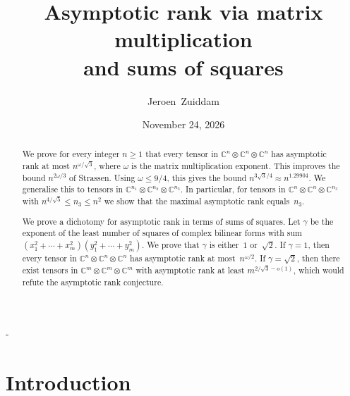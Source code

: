 \documentclass[11pt,letterpaper]{article}
\title{Asymptotic rank via matrix multiplication\\ and sums of squares}
\author{Jeroen~Zuiddam}
\date{November 24, 2026}
\affil{University of Amsterdam}
\makeatletter
\numberwithin{equation}{section}
\newcommand{\reservelines}[1]{\par\penalty\z@\dimen@\pagegoal\advance\dimen@-\pagetotal
 \ifdim\dimen@<#1\baselineskip\ifdim\dimen@>\z@\vfil\fi\break\fi}
\let\plainsection\section
\renewcommand{\section}{\reservelines{7}\plainsection}
\theoremstyle{definition}
\newcommand{\CC}{\mathbb{C}}
\makeatother
\begin{document}
\maketitle

\begin{abstract}
We prove for every integer $n\ge1$ that every tensor in $\CC^n\otimes\CC^n\otimes\CC^n$ has asymptotic rank at most $n^{\omega/\sqrt3}$, where
$\omega$ is the matrix multiplication exponent. This improves the bound $n^{2\omega/3}$ of Strassen. Using
$\omega\le9/4$, this gives the bound $n^{3\sqrt3/4}\approx n^{1.29904}$. We generalise this to tensors in $\CC^{n_1} \otimes \CC^{n_2} \otimes \CC^{n_3}$. In particular, for tensors in $\CC^n\otimes\CC^n\otimes\CC^{n_3}$ with
$n^{4/\sqrt5}\le n_3\le n^2$ we show that the maximal asymptotic rank equals~$n_3$. 

We prove a dichotomy for asymptotic rank in terms of sums of squares. Let $\gamma$ be the
exponent of the least number of squares of complex bilinear forms with sum $(x_1^2+\cdots+x_m^2)(y_1^2+\cdots+y_m^2)$.
We prove that $\gamma$ is either~$1$ or~$\sqrt2$. If $\gamma=1$, then every tensor in
$\CC^n\otimes\CC^n\otimes\CC^n$ has asymptotic rank at most~$n^{\omega/2}$. If $\gamma=\sqrt2$, then there exist tensors in $\CC^m\otimes\CC^m\otimes\CC^m$ with
asymptotic rank at least $m^{2/\sqrt3-o(1)}$, which would refute the asymptotic rank conjecture.

\end{abstract}

\section{Introduction}\label{sec:intro}
\end{document}
